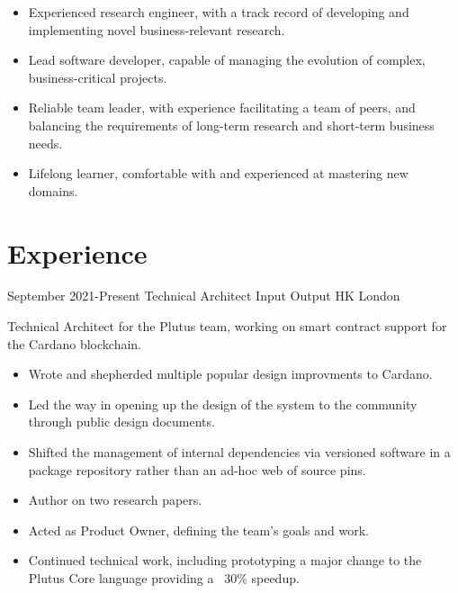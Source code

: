 \documentclass[12pt,a4paper,sans]{moderncv}
\begin{document}
\maketitle

\begin{itemize}
  \item Experienced research engineer, with a track record of developing and implementing novel business-relevant research.
  \item Lead software developer, capable of managing the evolution of complex, business-critical projects.
  \item Reliable team leader, with experience facilitating a team of peers, and balancing the requirements of long-term research and short-term business needs.
  \item Lifelong learner, comfortable with and experienced at mastering new domains.
\end{itemize}

\section{Experience}
\cventry
{September 2021-Present}
{Technical Architect}
{Input Output HK}
{London}
{}
{
  Technical Architect for the Plutus team, working on smart contract support for the Cardano blockchain.
  \begin{itemize}
    \item Wrote and shepherded multiple popular design improvments to Cardano.
    \item Led the way in opening up the design of the system to the community through public design documents.
    \item Shifted the management of internal dependencies via versioned software in a package repository rather than an ad-hoc web of source pins.
    \item Author on two research papers.
    \item Acted as Product Owner, defining the team's goals and work.
    \item Continued technical work, including prototyping a major change to the Plutus Core language providing a ~30\% speedup.
  \end{itemize}
}
\end{document}
